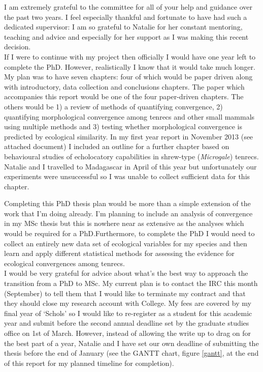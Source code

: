 \documentclass[12pt,a4paper]{article}
\begin{document}
	I am extremely grateful to the committee for all of your help and guidance over the past two years. I feel especially thankful and fortunate to have had such a dedicated supervisor: I am so grateful to Natalie for her constant mentoring, teaching and advice and especially for her support as I was making this recent decision.\\  %
	
	If I were to continue with my project then officially I would have one year left to complete the PhD. However, realistically I know that it would take much longer. My plan was to have seven chapters: four of which would be paper driven along with introductory, data collection and conclusions chapters. The paper which accompanies this report would be one of the four paper-driven chapters. The others would be 1) a review of methods of quantifying convergence, 
	2) quantifying morphological convergence among tenrecs and other small mammals using multiple methods and 3) testing whether morphological convergence is predicted by ecological similarity.
    In my first year report in November 2013 (see attached document) I included an outline for a further chapter based on behavioural studies of echolocatory capabilities in shrew-type (\textit{Microgale}) tenrecs. Natalie and I travelled to Madagascar in April of this year but unfortunately our experiments were unsuccessful so I was unable to collect sufficient data for this chapter.
	
	Completing this PhD thesis plan would be more than a simple extension of the work that I'm doing already. 
	I'm planning to include an analysis of convergence in my MSc thesis but this is nowhere near as extensive as the analyses which would be required for a PhD.Furthermore, to complete the PhD I would need to collect an entirely new data set of ecological variables for my species and then learn and apply different statistical methods for assessing the evidence for ecological convergences among tenrecs.\\

	I would be very grateful for advice about what's the best way to approach the transition from a PhD to MSc. My current plan is to contact the IRC this month (September) to tell them that I would like to terminate my contract and that they should close my research account with College. My fees are covered by my final year of `Schols' so I would like to re-register as a student for this academic year and submit before the second annual deadline set by the graduate studies office on 1st of March. However, instead of allowing the write up to drag on for the best part of a year, Natalie and I have set our own deadline of submitting the thesis before the end of January (see the GANTT chart, figure \ref*{gantt}, at the end of this report for my planned timeline for completion).
 
\end{document}

